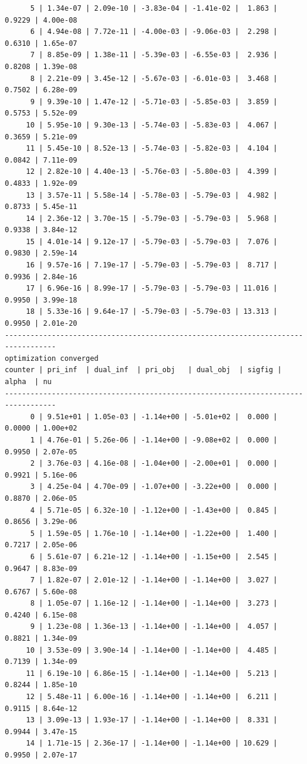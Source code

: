 \documentclass[
]{book}
\begin{document}
\begin{verbatim}
      5 | 1.34e-07 | 2.09e-10 | -3.83e-04 | -1.41e-02 |  1.863 | 0.9229 | 4.00e-08
      6 | 4.94e-08 | 7.72e-11 | -4.00e-03 | -9.06e-03 |  2.298 | 0.6310 | 1.65e-07
      7 | 8.85e-09 | 1.38e-11 | -5.39e-03 | -6.55e-03 |  2.936 | 0.8208 | 1.39e-08
      8 | 2.21e-09 | 3.45e-12 | -5.67e-03 | -6.01e-03 |  3.468 | 0.7502 | 6.28e-09
      9 | 9.39e-10 | 1.47e-12 | -5.71e-03 | -5.85e-03 |  3.859 | 0.5753 | 5.52e-09
     10 | 5.95e-10 | 9.30e-13 | -5.74e-03 | -5.83e-03 |  4.067 | 0.3659 | 5.21e-09
     11 | 5.45e-10 | 8.52e-13 | -5.74e-03 | -5.82e-03 |  4.104 | 0.0842 | 7.11e-09
     12 | 2.82e-10 | 4.40e-13 | -5.76e-03 | -5.80e-03 |  4.399 | 0.4833 | 1.92e-09
     13 | 3.57e-11 | 5.58e-14 | -5.78e-03 | -5.79e-03 |  4.982 | 0.8733 | 5.45e-11
     14 | 2.36e-12 | 3.70e-15 | -5.79e-03 | -5.79e-03 |  5.968 | 0.9338 | 3.84e-12
     15 | 4.01e-14 | 9.12e-17 | -5.79e-03 | -5.79e-03 |  7.076 | 0.9830 | 2.59e-14
     16 | 9.57e-16 | 7.19e-17 | -5.79e-03 | -5.79e-03 |  8.717 | 0.9936 | 2.84e-16
     17 | 6.96e-16 | 8.99e-17 | -5.79e-03 | -5.79e-03 | 11.016 | 0.9950 | 3.99e-18
     18 | 5.33e-16 | 9.64e-17 | -5.79e-03 | -5.79e-03 | 13.313 | 0.9950 | 2.01e-20
----------------------------------------------------------------------------------
optimization converged
counter | pri_inf  | dual_inf  | pri_obj   | dual_obj  | sigfig | alpha  | nu 
----------------------------------------------------------------------------------
      0 | 9.51e+01 | 1.05e-03 | -1.14e+00 | -5.01e+02 |  0.000 | 0.0000 | 1.00e+02
      1 | 4.76e-01 | 5.26e-06 | -1.14e+00 | -9.08e+02 |  0.000 | 0.9950 | 2.07e-05
      2 | 3.76e-03 | 4.16e-08 | -1.04e+00 | -2.00e+01 |  0.000 | 0.9921 | 5.16e-06
      3 | 4.25e-04 | 4.70e-09 | -1.07e+00 | -3.22e+00 |  0.000 | 0.8870 | 2.06e-05
      4 | 5.71e-05 | 6.32e-10 | -1.12e+00 | -1.43e+00 |  0.845 | 0.8656 | 3.29e-06
      5 | 1.59e-05 | 1.76e-10 | -1.14e+00 | -1.22e+00 |  1.400 | 0.7217 | 2.05e-06
      6 | 5.61e-07 | 6.21e-12 | -1.14e+00 | -1.15e+00 |  2.545 | 0.9647 | 8.83e-09
      7 | 1.82e-07 | 2.01e-12 | -1.14e+00 | -1.14e+00 |  3.027 | 0.6767 | 5.60e-08
      8 | 1.05e-07 | 1.16e-12 | -1.14e+00 | -1.14e+00 |  3.273 | 0.4240 | 6.15e-08
      9 | 1.23e-08 | 1.36e-13 | -1.14e+00 | -1.14e+00 |  4.057 | 0.8821 | 1.34e-09
     10 | 3.53e-09 | 3.90e-14 | -1.14e+00 | -1.14e+00 |  4.485 | 0.7139 | 1.34e-09
     11 | 6.19e-10 | 6.86e-15 | -1.14e+00 | -1.14e+00 |  5.213 | 0.8244 | 1.85e-10
     12 | 5.48e-11 | 6.00e-16 | -1.14e+00 | -1.14e+00 |  6.211 | 0.9115 | 8.64e-12
     13 | 3.09e-13 | 1.93e-17 | -1.14e+00 | -1.14e+00 |  8.331 | 0.9944 | 3.47e-15
     14 | 1.71e-15 | 2.36e-17 | -1.14e+00 | -1.14e+00 | 10.629 | 0.9950 | 2.07e-17

\end{verbatim}
\end{document}

